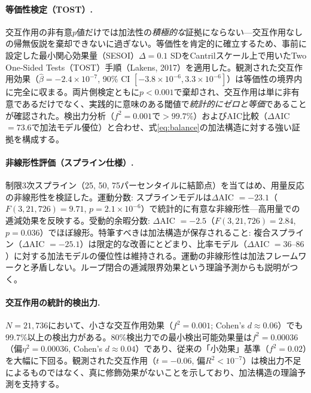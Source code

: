 \documentclass[a4paper,11pt,titlepage]{article}
\begin{document}
\paragraph{等価性検定（TOST）.}
交互作用の非有意$p$値だけでは加法性の\textit{積極的な}証拠にならない---交互作用なしの帰無仮説を棄却できないに過ぎない。等価性を肯定的に確立するため、事前に設定した最小関心効果量（SESOI）$\Delta = 0.1$ SDをCantrilスケール上で用いたTwo One-Sided Tests（TOST）手順（Lakens, 2017）を適用した。観測された交互作用効果（$\hat{\beta} = -2.4 \times 10^{-7}$, 90\% CI $[-3.8 \times 10^{-6}, 3.3 \times 10^{-6}]$）は等価性の境界内に完全に収まる。両片側検定ともに$p < 0.001$で棄却され、交互作用は単に非有意であるだけでなく、実践的に意味のある閾値で\textit{統計的にゼロと等価}であることが確認された。検出力分析（$f^2 = 0.001$で$> 99.7\%$）およびAIC比較（$\Delta$AIC $= 73.6$で加法モデル優位）と合わせ、式\eqref{eq:balance}の加法構造に対する強い証拠を構成する。

\paragraph{非線形性評価（スプライン仕様）.}
制限3次スプライン（25, 50, 75パーセンタイルに結節点）を当てはめ、用量反応の非線形性を検証した。運動分数: スプラインモデルは$\Delta$AIC $= -23.1$（$F(3, 21{,}726) = 9.71$, $p = 2.1 \times 10^{-6}$）で統計的に有意な非線形性---高用量での逓減効果を反映する。受動的余暇分数: $\Delta$AIC $= -2.5$（$F(3, 21{,}726) = 2.84$, $p = 0.036$）でほぼ線形。特筆すべきは加法構造が保存されること: 複合スプライン（$\Delta$AIC $= -25.1$）は限定的な改善にとどまり、比率モデル（$\Delta$AIC $= 36$--$86$）に対する加法モデルの優位性は維持される。運動の非線形性は加法フレームワークと矛盾しない。ループ閉合の逓減限界効果という理論予測からも説明がつく。

\paragraph{交互作用の統計的検出力.}
$N = 21{,}736$において、小さな交互作用効果（$f^2 = 0.001$; Cohen's $d \approx 0.06$）でも99.7\%以上の検出力がある。80\%検出力での最小検出可能効果量は$f^2 = 0.00036$（偏$\eta^2 = 0.00036$, Cohen's $d \approx 0.04$）であり、従来の「小効果」基準（$f^2 = 0.02$）を大幅に下回る。観測された交互作用（$t = -0.06$, 偏$R^2 < 10^{-7}$）は検出力不足によるものではなく、真に修飾効果がないことを示しており、加法構造の理論予測を支持する。
\end{document}
